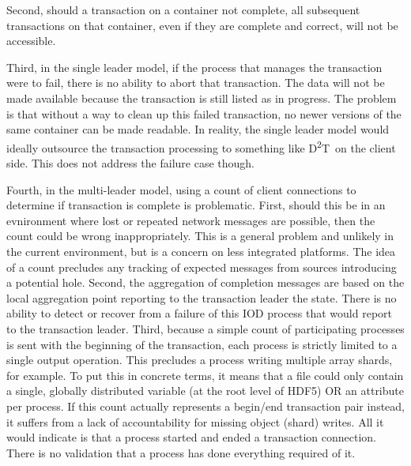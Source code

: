 \documentclass[conference]{sig-alt-gov2}
\newcommand{\DDT}{D\textsuperscript{2}T~}
\begin{document}
Second, should a transaction on a container not complete, all subsequent
transactions on that container, even if they are complete and correct, will not
be accessible.

Third, in the single leader model, if the process that manages the transaction
were to fail, there is no ability to abort that transaction. The data will not
be made available because the transaction is still listed as in progress. The
problem is that without a way to clean up this failed transaction, no newer
versions of the same container can be made readable. In reality, the single
leader model would ideally outsource the transaction processing to something
like \DDT on the client side. This does not address the failure case though.

Fourth, in the multi-leader model, using a count of client connections to
determine if transaction is complete is problematic.  First, should this be in
an evnironment where lost or repeated network messages are possible, then the
count could be wrong inappropriately. This is a general problem and unlikely
in the current environment, but is a concern on less integrated platforms.
The idea of a count precludes any tracking of expected messages from sources
introducing a potential hole. Second, the aggregation of completion messages
are based on the local aggregation point reporting to the transaction
leader the state.  There is no ability to detect or recover from a failure of
this IOD process that would report to the transaction leader. Third, because a
simple count of participating processes is sent with the beginning of the
transaction, each process is strictly limited to a single output operation.
This precludes a process writing multiple array shards, for example. To put
this in concrete terms, it means that a file could only contain a single,
globally distributed variable (at the root level of HDF5) OR an attribute per
process. If this count actually represents a begin/end transaction pair
instead, it suffers from a lack of accountability for missing object (shard)
writes. All it would indicate is that a process started and ended a transaction
connection. There is no validation that a process has done everything required
of it.
\end{document}
